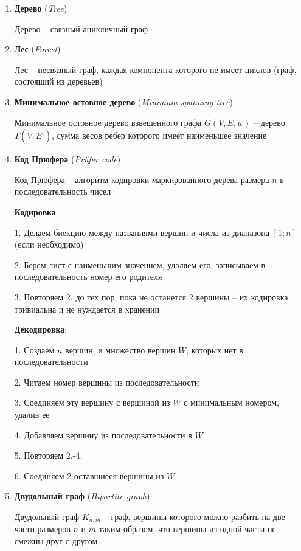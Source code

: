 \documentclass[12pt]{article}
\begin{document}
\begin{enumerate}
        \item \textbf{Дерево} (\textit{Tree})

        Дерево -- связный ацикличный граф

        \item \textbf{Лес} (\textit{Forest})

        Лес -- несвязный граф, каждая компонента которого не имеет циклов (граф, состоящий из деревьев)

        \item \textbf{Минимальное остовное дерево} (\textit{Minimum spanning tree})

        Минимальное остовное дерево взвешенного графа $G(V, E, w)$ -- дерево $T(V, E^\prime)$, сумма весов ребер которого имеет наименьшее значение

        \item \textbf{Код Прюфера} (\textit{Prüfer code})

        Код Прюфера -- алгоритм кодировки маркированного дерева размера $n$ в последовательность чисел

        \textbf{Кодировка}:

        1. Делаем биекцию между названиями вершин и числа из диапазона $[1;n]$ (если необходимо)

        2. Берем лист с наименьшим значением, удаляем его, записываем в последовательность номер его родителя

        3. Повторяем 2. до тех пор, пока не останется 2 вершины -- их кодировка тривиальна и не нуждается в хранении

        \textbf{Декодировка}:

        1. Создаем $n$ вершин, и множество вершин $W$, которых нет в последовательности

        2. Читаем номер вершины из последовательности

        3. Соединяем эту вершину с вершиной из $W$ с минимальным номером, удалив ее

        4. Добавляем вершину из последовательности в $W$

        5. Повторяем 2.-4.

        6. Соединяем 2 оставшиеся вершины из $W$


        \item \textbf{Двудольный граф} (\textit{Bipartite graph})

        Двудольный граф $K_{n,m}$ -- граф, вершины которого можно разбить на две части размеров $n$ и $m$ таким образом, что вершины из одной части не смежны друг с другом


\end{enumerate}
\end{document}
